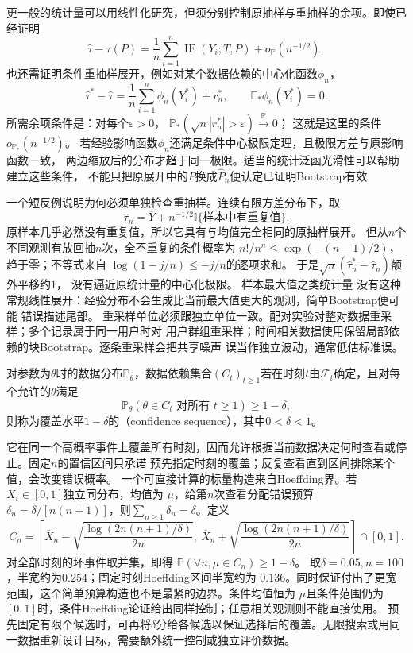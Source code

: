 更一般的统计量可以用线性化研究，但须分别控制原抽样与重抽样的余项。即使已经证明
\[
  \widehat\tau-\tau(P)
  =
  \frac1n\sum_{i=1}^n\operatorname{IF}(Y_i;T,P)
  +o_{\mathbb{P}}(n^{-1/2}),
\]
也还需证明条件重抽样展开，例如对某个数据依赖的中心化函数\(\phi_n\)，
\[
 \widehat\tau^\ast-\widehat\tau
 =\frac1n\sum_{i=1}^n\phi_n(Y_i^\ast)+r_n^\ast,\qquad
 \mathbb E_\ast\phi_n(Y_i^\ast)=0.
\]
所需余项条件是：对每个\(\varepsilon>0\)，
\(\mathbb P_\ast(\sqrt n|r_n^\ast|>\varepsilon)\xrightarrow{\mathbb P}0\)；
这就是这里的条件\(o_{\mathbb P_\ast}(n^{-1/2})\)。
若经验影响函数\(\phi_n\)还满足条件中心极限定理，且极限方差与原影响函数一致，
两边缩放后的分布才趋于同一极限。适当的统计泛函光滑性可以帮助建立这些条件，
不能只把原展开中的\(P\)换成\(\widehat P_n\)便认定已证明Bootstrap有效

一个短反例说明为何必须单独检查重抽样。连续有限方差分布下，取
\[
 \widehat\tau_n=\overline Y+n^{-1/2}
 \mathbb I\{\text{样本中有重复值}\}.
\]
原样本几乎必然没有重复值，所以它具有与均值完全相同的原抽样展开。
但从\(n\)个不同观测有放回抽\(n\)次，全不重复的条件概率为
\(n!/n^n\leq\exp(-(n-1)/2)\)，趋于零；不等式来自
\(\log(1-j/n)\leq-j/n\)的逐项求和。
于是\(\sqrt n(\widehat\tau_n^\ast-\widehat\tau_n)\)额外平移约\(1\)，
没有逼近原统计量的中心化极限。
样本最大值之类统计量
没有这种常规线性展开：经验分布不会生成比当前最大值更大的观测，简单Bootstrap便可能
错误描述尾部。
重采样单位必须跟独立单位一致。配对实验对整对数据重采样；多个记录属于同一用户时对
用户群组重采样；时间相关数据使用保留局部依赖的块Bootstrap。逐条重采样会把共享噪声
误当作独立波动，通常低估标准误。
\begin{definition}[置信序列]
  \label{def:stoch-confidence-sequence}
  对参数为\(\theta\)时的数据分布\(\mathbb P_\theta\)，数据依赖集合\((C_t)_{t\geq1}\)若在时刻\(t\)由\(\mathcal F_t\)确定，且对每个允许的\(\theta\)满足
  \[ \mathbb P_\theta(\theta\in C_t\text{ 对所有 }t\geq1)\geq1-\delta, \]
  则称为覆盖水平\(1-\delta\)的（confidence sequence），其中\(0<\delta<1\)。
\end{definition}
它在同一个高概率事件上覆盖所有时刻，因而允许根据当前数据决定何时查看或停止。固定$n$的置信区间只承诺
预先指定时刻的覆盖；反复查看直到区间排除某个值，会改变错误概率。
一个可直接计算的标量构造来自Hoeffding界。若\(X_i\in[0,1]\)独立同分布，均值为
\(\mu\)，给第\(n\)次查看分配错误预算
\(\delta_n=\delta/[n(n+1)]\)，则\(\sum_{n\geq1}\delta_n=\delta\)。定义
\[
C_n=\left[\overline X_n-
\sqrt{\frac{\log(2n(n+1)/\delta)}{2n}},
\ \overline X_n+
\sqrt{\frac{\log(2n(n+1)/\delta)}{2n}}\right]\cap[0,1].
\]
对全部时刻的坏事件取并集，即得
\(\mathbb P(\forall n,\mu\in C_n)\geq1-\delta\)。
取\(\delta=0.05,n=100\)，半宽约为\(0.254\)；固定时刻Hoeffding区间半宽约为
\(0.136\)。同时保证付出了更宽范围，这个简单预算构造也不是最紧的边界。条件均值恒为
\(\mu\)且条件范围仍为\([0,1]\)时，条件Hoeffding论证给出同样控制；任意相关观测则不能直接使用。
预先固定有限个候选时，可再将\(\delta\)分给各候选以保证选择后的覆盖。无限搜索或用同一数据重新设计目标，需要额外统一控制或独立评价数据。

